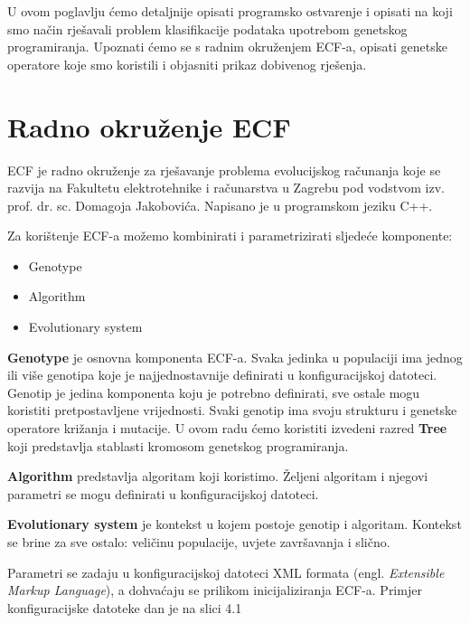 \documentclass[times, utf8, zavrsni]{fer}
\begin{document}
U ovom poglavlju ćemo detaljnije opisati programsko ostvarenje i opisati na koji smo način rješavali problem klasifikacije podataka upotrebom genetskog programiranja. Upoznati ćemo se s radnim okruženjem ECF-a, opisati genetske operatore koje smo koristili i objasniti prikaz dobivenog rješenja.

\section{Radno okruženje ECF}

ECF  je radno okruženje za rješavanje problema evolucijskog računanja koje se razvija na Fakultetu elektrotehnike i računarstva u Zagrebu pod vodstvom izv. prof. dr. sc. Domagoja Jakobovića. Napisano je u programskom jeziku C++. 

Za korištenje ECF-a možemo kombinirati i parametrizirati sljedeće komponente:

\begin{itemize}
\item Genotype
\item Algorithm
\item Evolutionary system
\end{itemize}

\textbf{Genotype} je osnovna komponenta ECF-a. Svaka jedinka u populaciji ima jednog ili više genotipa koje je najjednostavnije definirati u konfiguracijskoj datoteci. Genotip je jedina komponenta koju je potrebno definirati, sve ostale mogu koristiti pretpostavljene vrijednosti. Svaki genotip ima svoju strukturu i genetske operatore križanja i mutacije. U ovom radu ćemo koristiti izvedeni razred \textbf{Tree} koji predstavlja stablasti kromosom genetskog programiranja.

\textbf{Algorithm} predstavlja algoritam koji koristimo. Željeni algoritam i njegovi parametri se mogu definirati u konfiguracijskoj datoteci.

\textbf{Evolutionary system} je kontekst u kojem postoje genotip i algoritam. Kontekst se brine za sve ostalo: veličinu populacije, uvjete završavanja i slično. 

Parametri se zadaju u konfiguracijskoj datoteci XML formata (engl. \textit{Extensible Markup Language}), a dohvaćaju se prilikom inicijaliziranja ECF-a. Primjer konfiguracijske datoteke dan je na slici 4.1
\end{document}
